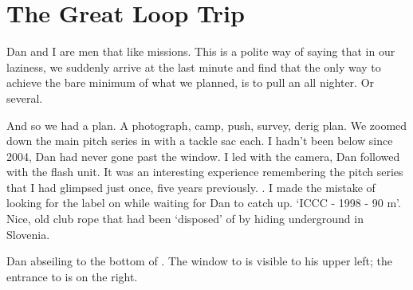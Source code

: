 \section{The Great Loop Trip}


Dan and I are men that like missions. This is a polite way of saying
that in our laziness, we suddenly arrive at the last minute and find
that the only way to achieve the bare minimum of what we planned, is to
pull an all nighter. Or several.

And so we had a plan. A photograph, camp, push, survey, derig plan. We
zoomed down the main pitch series in  with a tackle sac
each. I hadn't been below  since 2004, Dan had never gone
past the  window. I led with the camera, Dan
followed with the flash unit. It was an interesting experience
remembering the pitch series that I had glimpsed just once, five years
previously. . I made the mistake of looking
for the label on  while waiting for Dan to catch up.
`ICCC - 1998 - 90 m'. Nice, old club rope that had been `disposed' of by
hiding underground in Slovenia.


\begin{pagefigure}
\checkoddpage \ifoddpage \forcerectofloat \else \forceversofloat \fi
\centering
 \caption{Dan abseiling to the bottom of \protect{}. The window to \protect{} is visible to his upper left; the entrance to \protect{} is on the right. }
 \label{leopard friendship}
\end{pagefigure}


